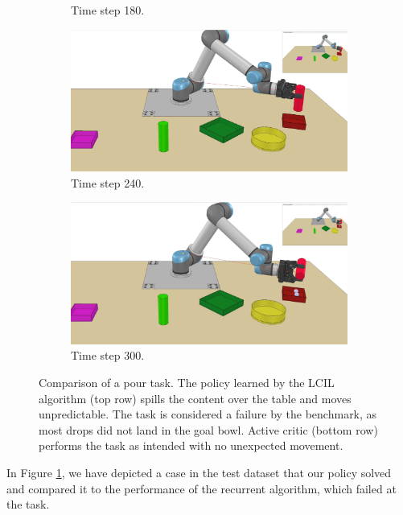 \begin{figure}
\begin{subfigure}[t]{0.18\textwidth}
        \caption{Time step 180.}
    \end{subfigure}
    \begin{subfigure}[t]{0.18\textwidth}
        \includegraphics[width=\linewidth]{images/Language_Conditioned_Exp/mine_4.png}
        \caption{Time step 240.}
    \end{subfigure}
    \begin{subfigure}[t]{0.18\textwidth}
        \includegraphics[width=\linewidth]{images/Language_Conditioned_Exp/mine_5.png}
        \caption{Time step 300.}
    \end{subfigure}
    \caption{Comparison of a pour task. The policy learned by the LCIL algorithm (top row) spills the content over the table and moves unpredictable. The task is considered a failure 
    by the benchmark, as most drops did not land in the goal bowl. Active critic (bottom row) performs the task as intended with no unexpected movement.}
    \label{fig: AVC vs. Rec}
\end{figure}
In Figure \ref{fig: AVC vs. Rec}, we have depicted a case in the test dataset that our policy solved and compared it to the performance 
of the recurrent algorithm, which failed at the task. \\

